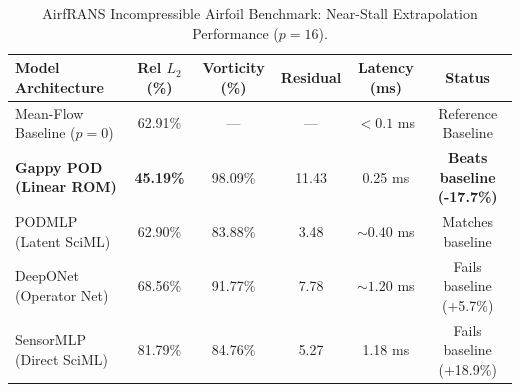 \begin{table}[h!]
\centering
\caption{AirfRANS Incompressible Airfoil Benchmark: Near-Stall Extrapolation Performance ($p = 16$).}
\label{tab:airfrans_airfoil_benchmark}
\begin{tabular}{lccccc}
\toprule
\textbf{Model Architecture} & \textbf{Rel $L_2$ (\%)} & \textbf{Vorticity (\%)} & \textbf{Residual} & \textbf{Latency (ms)} & \textbf{Status} \\
\midrule
Mean-Flow Baseline ($p=0$) & 62.91\% & --- & --- & $< 0.1$ ms & Reference Baseline \\
\textbf{Gappy POD (Linear ROM)} & \textbf{45.19\%} & 98.09\% & 11.43 & 0.25 ms & \textbf{Beats baseline (-17.7\%)} \\
PODMLP (Latent SciML) & 62.90\% & 83.88\% & 3.48 & $\sim 0.40$ ms & Matches baseline \\
DeepONet (Operator Net) & 68.56\% & 91.77\% & 7.78 & $\sim 1.20$ ms & Fails baseline (+5.7\%) \\
SensorMLP (Direct SciML) & 81.79\% & 84.76\% & 5.27 & 1.18 ms & Fails baseline (+18.9\%) \\
\bottomrule
\end{tabular}
\end{table}
